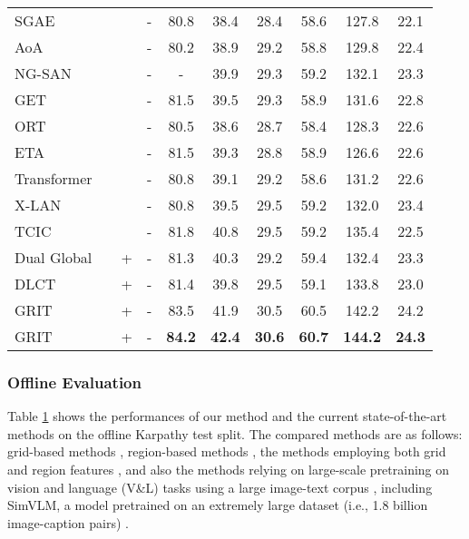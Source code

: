 \documentclass[runningheads]{llncs}
\begin{document}
\begin{table}[!t]
{\begin{tabular}{l c c c c c c c c c}
        SGAE \cite{yang2019auto} &  &  &- &80.8& 38.4 & 28.4 & 58.6&127.8 & 22.1 \\
        AoA \cite{huang2019attention} &  &  & - &80.2 & 38.9 & 29.2 & 58.8 & 129.8 & 22.4 \\
        NG-SAN \cite{guo2020normalized} &  &  & - & - & 39.9 & 29.3 & 59.2 & 132.1 & 23.3 \\
        GET \cite{ji2021improving} &  &  & - & 81.5 & 39.5 & 29.3 & 58.9 & 131.6 & 22.8 \\
        
        ORT \cite{herdade2019image} &  &  & -& 80.5 & 38.6 & 28.7 & 58.4&128.3 & 22.6 \\
        ETA \cite{li2019entangled} &  &  & -& 81.5 & 39.3 & 28.8 & 58.9& 126.6  & 22.6 \\
         Transformer \cite{cornia2020meshed} &  &  & -& 80.8 & 39.1 & 29.2 & 58.6 & 131.2 & 22.6 \\
        X-LAN \cite{pan2020x} &  &  & -& 80.8 & 39.5 & 29.5 & 59.2 & 132.0 & 23.4 \\
        TCIC \cite{fan2021tcic} &  &  & - & 81.8 & 40.8 & 29.5 & 59.2 & 135.4 & 22.5 \\
        Dual Global \cite{xian2022dual} &  & + & -& 81.3 & 40.3 & 29.2 & 59.4 & 132.4 & 23.3 \\
        DLCT \cite{luo2021dual} &  & + &-& 81.4 & 39.8 & 29.5 & 59.1 & 133.8 & 23.0 \\\rowcolor{LightCyan}
        GRIT  &  &+ & - & 83.5 & 41.9 & 30.5  & 60.5 & 142.2 & {24.2} \\ \rowcolor{LightCyan}
        GRIT &  &+ & - &\textbf{84.2}&\textbf{42.4} &\textbf{30.6} &\textbf{60.7} &\textbf{144.2} & \textbf{24.3} \\ \bottomrule
    \end{tabular}}
    \label{tab:offline_test}
\end{table}

\subsubsection{Offline Evaluation} 
Table \ref{tab:offline_test} shows the performances
of our method and the current state-of-the-art methods on the offline Karpathy test split.
The compared methods are as follows: grid-based methods \cite{vinyals2015show,rennie2017self,yao2017boosting,zhang2021rstnet}, region-based methods \cite{anderson2018bottom,ke2019reflective,yao2018exploring,qin2019look,yang2019auto,huang2019attention,huang2019attention,guo2020normalized,ji2021improving,herdade2019image,li2019entangled,cornia2020meshed,pan2020x,fan2021tcic}, the methods employing both grid and region features \cite{xian2022dual,luo2021dual}, and also the methods relying on large-scale pretraining on vision and language (V\&L) tasks using a large image-text corpus \cite{zhou2020unified,li2020oscar,zhang2021vinvl}, including SimVLM, a model 
pretrained on an extremely large dataset (i.e., 1.8 billion image-caption pairs) \cite{wang2021simvlm}.
\end{document}
